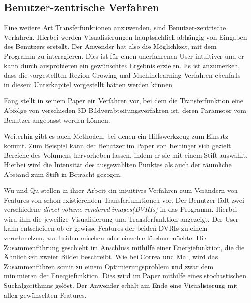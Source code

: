 \subsection{Benutzer-zentrische Verfahren}

Eine weitere Art Transferfunktionen anzuwenden, sind Benutzer-zentrische Verfahren. Hierbei werden Visualisierungen hauptsächlich abhängig von Eingaben des Benutzers erstellt.
\newline
Der Anwender hat also die Möglichkeit, mit dem Programm zu interagieren. Dies ist für einen unerfahrenen User intuitiver und er kann durch ausprobieren ein gewünschtes Ergebnis erzielen.
\newline
Es ist anzumerken, dass die vorgestellten Region Growing und Machinelearning Verfahren ebenfalls in diesem Unterkapitel vorgestellt hätten werden können.


Fang stellt in seinem Paper \cite{fang1998image} ein Verfahren vor, bei dem die  Transferfunktion eine Abfolge von verschieden 3D Bildverabteitungsverfahren ist, deren Parameter vom Benutzer angepasst werden können.


Weiterhin gibt es auch Methoden, bei denen ein Hilfswerkzeug zum Einsatz kommt. Zum Beispiel kann der Benutzer im Paper von Reitinger \cite{reitinger2004user} sich gezielt Bereiche des Volumens hervorheben lassen, indem er sie mit einem Stift auswählt.
\newline
Hierbei wird die Intensität des ausgewählten Punktes als auch der räumliche Abstand zum Stift in Betracht gezogen.


Wu und Qu stellen in ihrer Arbeit \cite{wu2007interactive} ein intuitives Verfahren zum Verändern von Features von schon existierenden Transferfunktionen vor.
\newline
Der Benutzer lädt zwei verschiedene \textit{direct volume rendered images(DVRIs)} in das Programm. Hierbei wird ihm die jeweilige Visualisierung und Transferfunktion angezeigt. Der User kann entscheiden ob er gewisse Features der beiden DVRIs zu einem verschmelzen, aus beiden mischen oder einzelne löschen möchte.
\newline
Die Zusammenführung geschieht im Anschluss mithilfe einer Energiefunktion, die die Ähnlichkeit zweier Bilder beschreibt. Wie bei Correa und Ma \cite{correa2009visibility}, wird das Zusammenführen somit zu einem Optimierungsproblem und zwar dem minimieren der Energiefunktion. Dies wird im Paper mithilfe eines stochastischen Suchalgorithmus gelöst.
\newline
Der Anwender erhält am Ende eine Visualisierung mit allen gewünschten Features.


